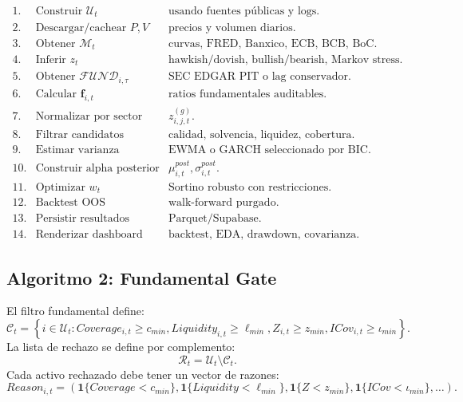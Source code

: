 \documentclass[11pt,letterpaper]{article}
\newcommand{\1}{\mathbf{1}}
\begin{document}
\[
\begin{array}{rll}
1. & \text{Construir } \mathcal{U}_t & \text{usando fuentes públicas y logs.}\\
2. & \text{Descargar/cachear } P,V & \text{precios y volumen diarios.}\\
3. & \text{Obtener } \mathcal{M}_t & \text{curvas, FRED, Banxico, ECB, BCB, BoC.}\\
4. & \text{Inferir } z_t & \text{hawkish/dovish, bullish/bearish, Markov stress.}\\
5. & \text{Obtener } \mathcal{FUND}_{i,\tau} & \text{SEC EDGAR PIT o lag conservador.}\\
6. & \text{Calcular } \bm f_{i,t} & \text{ratios fundamentales auditables.}\\
7. & \text{Normalizar por sector} & z_{i,j,t}^{(g)}.\\
8. & \text{Filtrar candidatos} & \text{calidad, solvencia, liquidez, cobertura.}\\
9. & \text{Estimar varianza} & \text{EWMA o GARCH seleccionado por BIC.}\\
10. & \text{Construir alpha posterior} & \mu^{post}_{i,t},\sigma^{post}_{i,t}.\\
11. & \text{Optimizar } w_t & \text{Sortino robusto con restricciones.}\\
12. & \text{Backtest OOS} & \text{walk-forward purgado.}\\
13. & \text{Persistir resultados} & \text{Parquet/Supabase.}\\
14. & \text{Renderizar dashboard} & \text{backtest, EDA, drawdown, covarianza.}
\end{array}
\]

\subsection{Algoritmo 2: Fundamental Gate}

El filtro fundamental define:
\[
    \mathcal{C}_t
    =
    \left\{
        i\in\mathcal{U}_t:
        Coverage_{i,t}\ge c_{min},
        Liquidity_{i,t}\ge \ell_{min},
        Z_{i,t}\ge z_{min},
        ICov_{i,t}\ge \iota_{min}
    \right\}.
\]
La lista de rechazo se define por complemento:
\[
    \mathcal{R}_t=\mathcal{U}_t\setminus\mathcal{C}_t.
\]
Cada activo rechazado debe tener un vector de razones:
\[
    Reason_{i,t}
    =
    (
        \1\{Coverage<c_{min}\},
        \1\{Liquidity<\ell_{min}\},
        \1\{Z<z_{min}\},
        \1\{ICov<\iota_{min}\},
        \ldots
    ).
\]
\end{document}
